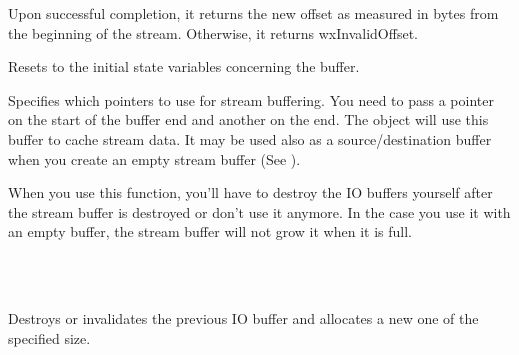 \twocolwidtha{5cm}
\begin{twocollist}\itemsep=0pt
\end{twocollist}


Upon successful completion, it returns the new offset as measured in bytes from
the beginning of the stream. Otherwise, it returns wxInvalidOffset.



Resets to the initial state variables concerning the buffer.

\label{wxstreambuffersetbufferio}


Specifies which pointers to use for stream buffering. You need to pass a pointer on the
start of the buffer end and another on the end. The object will use this buffer
to cache stream data. It may be used also as a source/destination buffer when
you create an empty stream buffer (See ).


When you use this function, you'll have to destroy the IO buffers yourself
after the stream buffer is destroyed or don't use it anymore.
In the case you use it with an empty buffer, the stream buffer will not grow
it when it is full.


\\
\\


Destroys or invalidates the previous IO buffer and allocates a new one of the
specified size.


